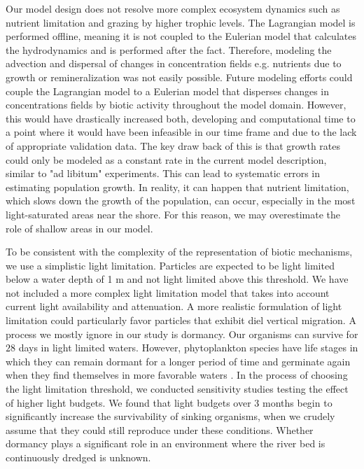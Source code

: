 \documentclass[npg, manuscript]{copernicus}
\begin{document}
Our model design does not resolve more complex ecosystem dynamics such as nutrient limitation and grazing by higher trophic levels. 
The Lagrangian model is performed offline, meaning it is not coupled to the Eulerian model that calculates the hydrodynamics and is performed after the fact.
Therefore, modeling the advection and dispersal of changes in concentration fields e.g. nutrients due to growth or remineralization was not easily possible.
Future modeling efforts could couple the Lagrangian model to a Eulerian model that disperses changes in concentrations fields by biotic activity throughout the model domain.
However, this would have drastically increased both, developing and computational time to a point where it would have been infeasible in our time frame and due to the lack of appropriate validation data.
The key draw back of this is that growth rates could only be modeled as a constant rate in the current model description, similar to "ad libitum" experiments. 
This can lead to systematic errors in estimating population growth.
In reality, it can happen that nutrient limitation, which slows down the growth of the population, can occur, especially in the most light-saturated areas near the shore. For this reason, we may overestimate the role of shallow areas in our model.

To be consistent with the complexity of the representation of biotic mechanisms, we use a simplistic light limitation.
Particles are expected to be light limited below a water depth of 1 \unit{m} and not light limited above this threshold. 
We have not included a more complex light limitation model that takes into account current light availability and attenuation.
A more realistic formulation of light limitation could particularly favor particles that exhibit diel vertical migration.
A process we mostly ignore in our study is dormancy.
Our organisms can survive for $28$ days in light limited waters.
However, phytoplankton species have life stages in which they can remain dormant for a longer period of time and germinate again when they find themselves in more favorable waters \citep{ThomasAnderson1998}.
In the process of choosing the light limitation threshold, we conducted sensitivity studies testing the effect of higher light budgets.
We found that light budgets over 3 months begin to significantly increase the survivability of sinking organisms, when we crudely assume that they could still reproduce under these conditions.
Whether dormancy plays a significant role in an environment where the river bed is continuously dredged is unknown.
\end{document}
